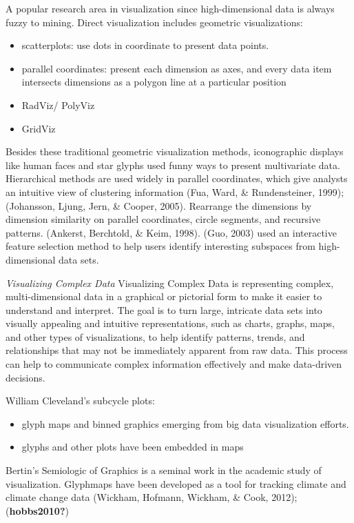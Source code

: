 \documentclass[print]{nuthesis}
\providecommand{\tightlist}{%
  \setlength{\itemsep}{0pt}\setlength{\parskip}{0pt}}
\begin{document}
A popular research area in visualization since high-dimensional data is always fuzzy to mining. Direct visualization includes geometric visualizations:

\begin{itemize}
\tightlist
\item
  scatterplots: use dots in coordinate to present data points.
\item
  parallel coordinates: present each dimension as axes, and every data item intersects dimensions as a polygon line at a particular position
\item
  RadViz/ PolyViz
\item
  GridViz
\end{itemize}

Besides these traditional geometric visualization methods, iconographic displays like human faces and star glyphs used funny ways to present multivariate data. Hierarchical methods are used widely in parallel coordinates, which give analysts an intuitive view of clustering information (Fua, Ward, \& Rundensteiner, 1999); (Johansson, Ljung, Jern, \& Cooper, 2005). Rearrange the dimensions by dimension similarity on parallel coordinates, circle segments, and recursive patterns. (Ankerst, Berchtold, \& Keim, 1998). (Guo, 2003) used an interactive feature selection method to help users identify interesting subspaces from high-dimensional data sets.

\emph{Visualizing Complex Data}
Visualizing Complex Data is representing complex, multi-dimensional data in a graphical or pictorial form to make it easier to understand and interpret. The goal is to turn large, intricate data sets into visually appealing and intuitive representations, such as charts, graphs, maps, and other types of visualizations, to help identify patterns, trends, and relationships that may not be immediately apparent from raw data. This process can help to communicate complex information effectively and make data-driven decisions.

William Cleveland's subcycle plots:

\begin{itemize}
\tightlist
\item
  glyph maps and binned graphics emerging from big data visualization efforts.
\item
  glyphs and other plots have been embedded in maps
\end{itemize}

Bertin's Semiologic of Graphics is a seminal work in the academic study of visualization. Glyphmaps have been developed as a tool for tracking climate and climate change data (Wickham, Hofmann, Wickham, \& Cook, 2012); (\textbf{hobbs2010?})
\end{document}
